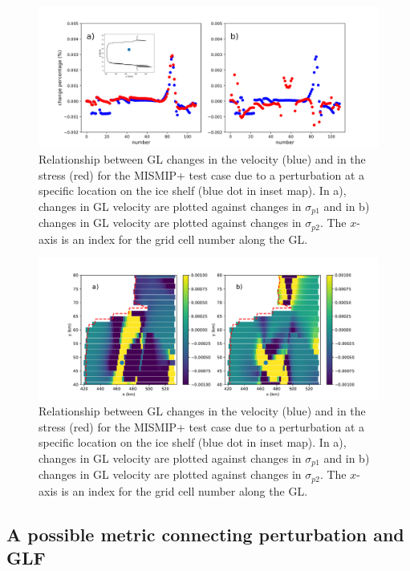 \documentclass[review,oneside]{igs}
\begin{document}
\begin{figure}
	\centering
    \includegraphics[width=1\linewidth]{figs/fig6_new.pdf}
    \caption{Relationship between GL {changes} in the velocity (blue) and in the stress (red) for the MISMIP+ test case due to a perturbation at a specific location on the ice shelf (blue dot in inset map). In a), changes in GL velocity are plotted against changes in $\sigma_{p1}$ and in b) changes in GL velocity are plotted against changes in $\sigma_{p2}$. The $x$-axis is an index for the grid cell number along the GL.}
	\label{fig6}
\end{figure}

\begin{figure}
	\centering
    \includegraphics[width=1\linewidth]{figs/sigma_change_example.pdf}
    \caption{Relationship between GL {changes} in the velocity (blue) and in the stress (red) for the MISMIP+ test case due to a perturbation at a specific location on the ice shelf (blue dot in inset map). In a), changes in GL velocity are plotted against changes in $\sigma_{p1}$ and in b) changes in GL velocity are plotted against changes in $\sigma_{p2}$. The $x$-axis is an index for the grid cell number along the GL.}
	\label{sigma_change_example}
\end{figure}

\subsection{A possible metric connecting perturbation and GLF}
\end{document}
